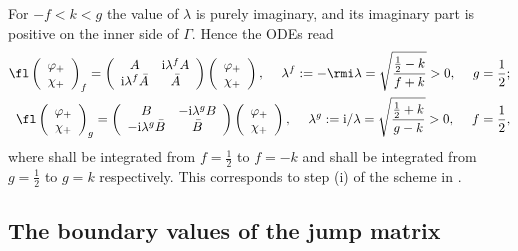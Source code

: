 \documentclass[12pt]{iopart}
\begin{document}
For $-f<k<g$ the value of $\lambda$ is purely imaginary, and its imaginary part is positive on the inner side of $\Gamma$. Hence the ODEs read
\begin{eqnarray}
\fl \left(\begin{array}{cc} \varphi_+ \\ \chi_+ \end{array}\right)_f = \left(\begin{array}{cc} A & {\rm i}\lambda^f A \\ {\rm i}\lambda^f \bar{A} & \bar{A} \end{array}\right) \left(\begin{array}{cc} \varphi_+ \\ \chi_+ \end{array}\right), \quad\; \lambda^f:=-\rmi\lambda=\sqrt{\frac{\frac12-k}{f+k}}>0, \quad\; g=\frac12; \label{ODE1} \\
\fl \left(\begin{array}{cc} \varphi_+ \\ \chi_+ \end{array}\right)_g = \left(\begin{array}{cc} B & -{\rm i}\lambda^g B \\ -{\rm i}\lambda^g \bar{B} & \bar{B} \end{array}\right) \left(\begin{array}{cc} \varphi_+ \\ \chi_+ \end{array}\right), \quad\; \lambda^g:={\rm i}/\lambda=\sqrt{\frac{\frac12+k}{g-k}}>0, \quad\; f=\frac12, \label{ODE2}
\end{eqnarray}
where  shall be integrated from $f=\frac12$ to $f=-k$ and  shall be integrated from $g=\frac12$ to $g=k$ respectively. This corresponds to step (i) of the scheme in .

\subsection{The boundary values of the jump matrix}
\end{document}
